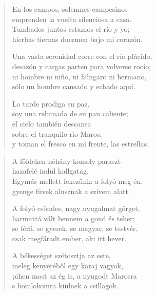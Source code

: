 \documentclass[11pt]{extbook}
\newcommand*{\centeredornament}{\centerline{\pgfornament[width=6cm]{88}}}
\begin{document}
\begin{verse}
  En los campos, solemnes campesinos \\
  emprenden la vuelta silenciosa a casa. \\
  Tumbados juntos estamos el río y yo; \\
  hierbas tiernas duermen bajo mi corazón.

  Una vasta serenidad corre con el río plácido, \\
  desazón y cargas parten para volverse rocío; \\
  ni hombre ni niño, ni húngaro ni hermano, \\
  sólo un hombre cansado y echado aquí.

  La tarde prodiga su paz, \\
  soy una rebanada de su pan caliente; \\
  el cielo también descansa \\
  sobre el tranquilo río Maros, \\
  y toman el fresco en mi frente, las estrellas.
\end{verse}

\newpage

\vspace*{-15mm}
\centeredornament



\begin{verse}
  A földeken néhány komoly paraszt \\
  hazafelé indul hallgatag. \\
  Egymás mellett fekszünk: a folyó meg én, \\
  gyenge füvek alusznak a szívem alatt.

  A folyó csöndes, nagy nyugalmat görget, \\
  harmattá vált bennem a gond és teher; \\
  se férfi, se gyerek, se magyar, se testvér, \\
  csak megfáradt ember, aki itt hever.

  A békességet szétosztja az este, \\
  meleg kenyeréből egy karaj vagyok, \\
  pihen most az ég is, a nyugodt Marosra \\
  s homlokomra kiülnek a csillagok.
\end{verse}

\newpage
\end{document}
